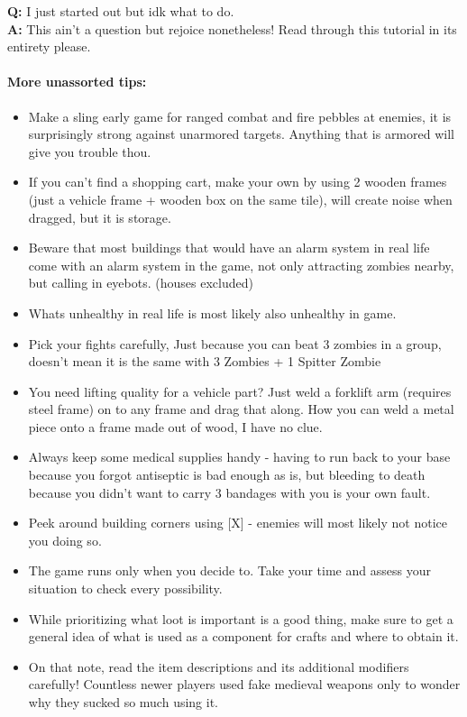 \textbf{Q:} I just started out but idk what to do.\\
\textbf{A:} This ain't a question but rejoice nonetheless! Read through this tutorial in its entirety please.

\paragraph{More unassorted tips:}
\begin{itemize}
\item Make a sling early game for ranged combat and fire pebbles at enemies, it is surprisingly strong against unarmored targets. Anything that is armored will give you trouble thou.
\item If you can't find a shopping cart, make your own by using 2 wooden frames (just a vehicle frame + wooden box on the same tile), will create noise when dragged, but it is storage.
\item Beware that most buildings that would have an alarm system in real life come with an alarm system in the game, not only attracting zombies nearby, but calling in eyebots. (houses excluded)
\item Whats unhealthy in real life is most likely also unhealthy in game.
\item Pick your fights carefully, Just because you can beat 3 zombies in a group, doesn't mean it is the same with 3 Zombies + 1 Spitter Zombie
\item You need lifting quality for a vehicle part? Just weld a forklift arm (requires steel frame) on to any frame and drag that along. How you can weld a metal piece onto a frame made out of wood, I have no clue.
\item Always keep some medical supplies handy - having to run back to your base because you forgot antiseptic is bad enough as is, but bleeding to death because you didn't want to carry 3 bandages with you is your own fault.
\item Peek around building corners using [X] - enemies will most likely not notice you doing so.
\item The game runs only when you decide to. Take your time and assess your situation to check every possibility.
\item While prioritizing what loot is important is a good thing, make sure to get a general idea of what is used as a component for crafts and where to obtain it.
\item On that note, read the item descriptions and its additional modifiers carefully! Countless newer players used fake medieval weapons only to wonder why they sucked so much using it.

\end{itemize}
